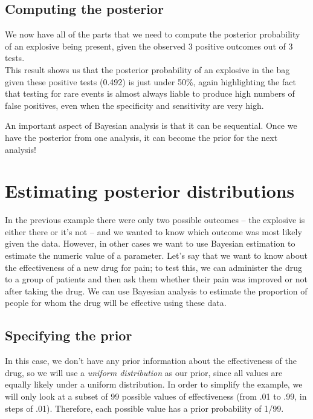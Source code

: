 \documentclass[
  12pt,
]{book}
\begin{document}
\hypertarget{computing-the-posterior}{%
\subsection{Computing the posterior}\label{computing-the-posterior}}

We now have all of the parts that we need to compute the posterior probability of an explosive being present, given the observed 3 positive outcomes out of 3 tests.\\
This result shows us that the posterior probability of an explosive in the bag given these positive tests (0.492) is just under 50\%, again highlighting the fact that testing for rare events is almost always liable to produce high numbers of false positives, even when the specificity and sensitivity are very high.

An important aspect of Bayesian analysis is that it can be sequential. Once we have the posterior from one analysis, it can become the prior for the next analysis!

\hypertarget{estimating-posterior-distributions}{%
\section{Estimating posterior distributions}\label{estimating-posterior-distributions}}

In the previous example there were only two possible outcomes -- the explosive is either there or it's not -- and we wanted to know which outcome was most likely given the data. However, in other cases we want to use Bayesian estimation to estimate the numeric value of a parameter. Let's say that we want to know about the effectiveness of a new drug for pain; to test this, we can administer the drug to a group of patients and then ask them whether their pain was improved or not after taking the drug. We can use Bayesian analysis to estimate the proportion of people for whom the drug will be effective using these data.

\hypertarget{specifying-the-prior-1}{%
\subsection{Specifying the prior}\label{specifying-the-prior-1}}

In this case, we don't have any prior information about the effectiveness of the drug, so we will use a \emph{uniform distribution} as our prior, since all values are equally likely under a uniform distribution. In order to simplify the example, we will only look at a subset of 99 possible values of effectiveness (from .01 to .99, in steps of .01). Therefore, each possible value has a prior probability of 1/99.
\end{document}
